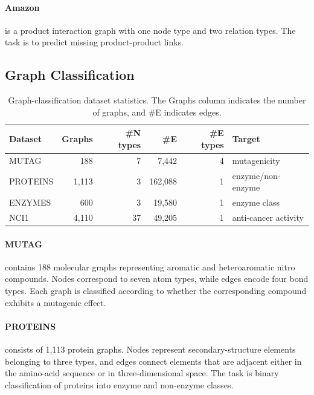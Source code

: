 \documentclass[sigconf,anonymous,review]{acmart}
\begin{document}
\paragraph{Amazon}
is a product interaction graph with one node type and two relation types. The
task is to predict missing product-product links.

\subsection{Graph Classification}

\begin{table}[H]
  \centering
  \caption{Graph-classification dataset statistics. The Graphs column indicates the
  number of graphs, and \#E indicates edges.}
  \label{tab:graph-datasets}
  \scriptsize
  \setlength{\tabcolsep}{2.5pt}
  \resizebox{\columnwidth}{!}
  {%
  \begin{tabular}{lrrrrl}
    \toprule
    \textbf{Dataset} & \textbf{Graphs} & \textbf{\#N types} & \textbf{\#E} &
    \textbf{\#E types} & \textbf{Target} \\
    \midrule
    MUTAG & 188 & 7 & 7{,}442 & 4 & mutagenicity \\
    PROTEINS & 1{,}113 & 3 & 162{,}088 & 1 & enzyme/non-enzyme \\
    ENZYMES & 600 & 3 & 19{,}580 & 1 & enzyme class \\
    NCI1 & 4{,}110 & 37 & 49{,}205 & 1 & anti-cancer activity \\
    \bottomrule
  \end{tabular}%
  }
\end{table}

\paragraph{MUTAG}
contains 188 molecular graphs representing aromatic and heteroaromatic
nitro compounds. Nodes correspond to seven atom types, while edges encode four
bond types. Each graph is classified according to whether the corresponding
compound exhibits a mutagenic effect.
\paragraph{PROTEINS}
consists of 1,113 protein graphs. Nodes represent secondary-structure
elements belonging to three types, and edges connect elements that are
adjacent either in the amino-acid sequence or in three-dimensional space. The
task is binary classification of proteins into enzyme and non-enzyme classes.
\end{document}

